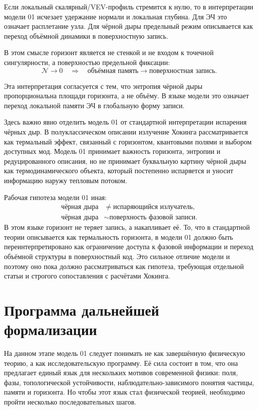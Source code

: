 \documentclass[11pt,a4paper]{article}
\newcommand{\normal}{\mathcal{N}}
\begin{document}
Если локальный скалярный/VEV-профиль стремится к нулю, то в интерпретации модели 01 исчезает удержание нормали и локальная глубина. Для ЭЧ это означает расплетание узла. Для чёрной дыры предельный режим описывается как переход объёмной динамики в поверхностную запись.

В этом смысле горизонт является не стенкой и не входом к точечной сингулярности, а поверхностью предельной фиксации:
\begin{equation}
\normal \to 0 \quad \Rightarrow \quad \text{объёмная память} \to \text{поверхностная запись}.
\end{equation}

Эта интерпретация согласуется с тем, что энтропия чёрной дыры пропорциональна площади горизонта, а не объёму. В языке модели это означает переход локальной памяти ЭЧ в глобальную форму записи.

Здесь важно явно отделить модель 01 от стандартной интерпретации испарения чёрных дыр. В полуклассическом описании излучение Хокинга рассматривается как термальный эффект, связанный с горизонтом, квантовыми полями и выбором доступных мод. Модель 01 принимает важность горизонта, энтропии и редуцированного описания, но не принимает буквальную картину чёрной дыры как термодинамического объекта, который постепенно испаряется и уносит информацию наружу тепловым потоком.

Рабочая гипотеза модели 01 иная:
\begin{equation}
\begin{aligned}
\text{чёрная дыра} &\neq \text{испаряющийся излучатель}, \\
\text{чёрная дыра} &\sim \text{поверхность фазовой записи}.
\end{aligned}
\end{equation}
В этом языке горизонт не теряет запись, а накапливает её. То, что в стандартной теории описывается как термальность горизонта, в модели 01 должно быть переинтерпретировано как ограничение доступа к фазовой информации и переход объёмной структуры в поверхностный код. Это сильное отличие модели и поэтому оно пока должно рассматриваться как гипотеза, требующая отдельной статьи и строгого сопоставления с расчётами Хокинга.

\section{Программа дальнейшей формализации}

На данном этапе модель 01 следует понимать не как завершённую физическую теорию, а как исследовательскую программу. Её сила состоит в том, что она предлагает единый язык для нескольких мотивов современной физики: поля, фазы, топологической устойчивости, наблюдательно-зависимого понятия частицы, памяти и горизонта. Но чтобы этот язык стал физической теорией, необходимо пройти несколько последовательных шагов.
\end{document}
